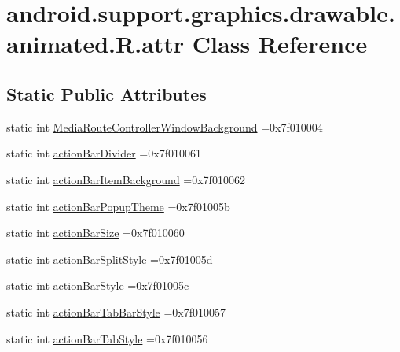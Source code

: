 \hypertarget{classandroid_1_1support_1_1graphics_1_1drawable_1_1animated_1_1R_1_1attr}{}\section{android.\+support.\+graphics.\+drawable.\+animated.\+R.\+attr Class Reference}
\label{classandroid_1_1support_1_1graphics_1_1drawable_1_1animated_1_1R_1_1attr}
\subsection*{Static Public Attributes}
\begin{DoxyCompactItemize}
\item 
static int \hyperlink{classandroid_1_1support_1_1graphics_1_1drawable_1_1animated_1_1R_1_1attr_ada6fd1952b19fe756c19a8cc28558df8}{Media\+Route\+Controller\+Window\+Background} =0x7f010004
\item 
static int \hyperlink{classandroid_1_1support_1_1graphics_1_1drawable_1_1animated_1_1R_1_1attr_afb2032d0219186092ae876ff6c3c9e29}{action\+Bar\+Divider} =0x7f010061
\item 
static int \hyperlink{classandroid_1_1support_1_1graphics_1_1drawable_1_1animated_1_1R_1_1attr_a4364ed8633d4db6e0e55992ce98dce9d}{action\+Bar\+Item\+Background} =0x7f010062
\item 
static int \hyperlink{classandroid_1_1support_1_1graphics_1_1drawable_1_1animated_1_1R_1_1attr_aeb3aef0d5804c08e9aa001f285f05a90}{action\+Bar\+Popup\+Theme} =0x7f01005b
\item 
static int \hyperlink{classandroid_1_1support_1_1graphics_1_1drawable_1_1animated_1_1R_1_1attr_a789262235c57d2ffdf43e8e48bdd1d54}{action\+Bar\+Size} =0x7f010060
\item 
static int \hyperlink{classandroid_1_1support_1_1graphics_1_1drawable_1_1animated_1_1R_1_1attr_adde5fb337c949ec653b61620e12fc314}{action\+Bar\+Split\+Style} =0x7f01005d
\item 
static int \hyperlink{classandroid_1_1support_1_1graphics_1_1drawable_1_1animated_1_1R_1_1attr_ac6de7c1a20157f53770fa9267012f343}{action\+Bar\+Style} =0x7f01005c
\item 
static int \hyperlink{classandroid_1_1support_1_1graphics_1_1drawable_1_1animated_1_1R_1_1attr_a5e85a5f713dc6df7714fc7579f4ddfd0}{action\+Bar\+Tab\+Bar\+Style} =0x7f010057
\item 
static int \hyperlink{classandroid_1_1support_1_1graphics_1_1drawable_1_1animated_1_1R_1_1attr_afd5d03259e4968e3c3bfd2f13d255d05}{action\+Bar\+Tab\+Style} =0x7f010056

\end{DoxyCompactItemize}
